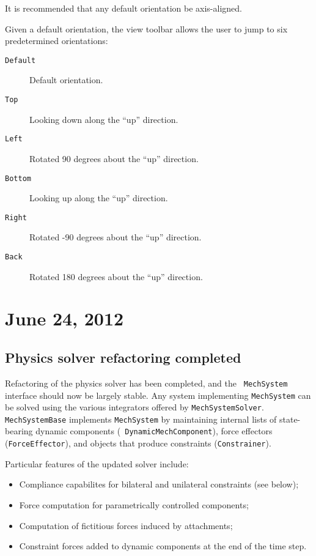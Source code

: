 \documentclass{article}
\begin{document}
It is recommended that any default orientation be axis-aligned. 

Given a default orientation, the view toolbar allows
the user to jump to six predetermined orientations:

\begin{description}

\item[{\tt Default} ] \mbox{}
Default orientation.

\item[{\tt Top} ] \mbox{}
Looking down along the ``up'' direction.

\item[{\tt Left} ] \mbox{}
Rotated 90 degrees about the ``up'' direction.

\item[{\tt Bottom} ] \mbox{}
Looking up along the ``up'' direction.

\item[{\tt Right} ] \mbox{}
Rotated -90 degrees about the ``up'' direction.

\item[{\tt Back} ] \mbox{}
Rotated 180 degrees about the ``up'' direction.

\end{description}

\section*{June 24, 2012}

\subsection*{Physics solver refactoring completed}

Refactoring of the physics solver has been completed, and the {\tt
MechSystem} interface should now be largely stable.  Any system
implementing {\tt MechSystem} can be solved using the various
integrators offered by {\tt MechSystemSolver}.
{\tt MechSystemBase} implements {\tt MechSystem} by maintaining
internal lists of state-bearing dynamic components ({\tt
DynamicMechComponent}), force effectors ({\tt ForceEffector}), and
objects that produce constraints ({\tt Constrainer}).

Particular features of the updated solver include:

\begin{itemize}

\item Compliance capabilites for bilateral and unilateral
constraints (see below);

\item Force computation for parametrically controlled components;

\item Computation of fictitious forces induced by attachments;

\item Constraint forces added to dynamic components at the end of
the time step.

\end{itemize}
\end{document}
